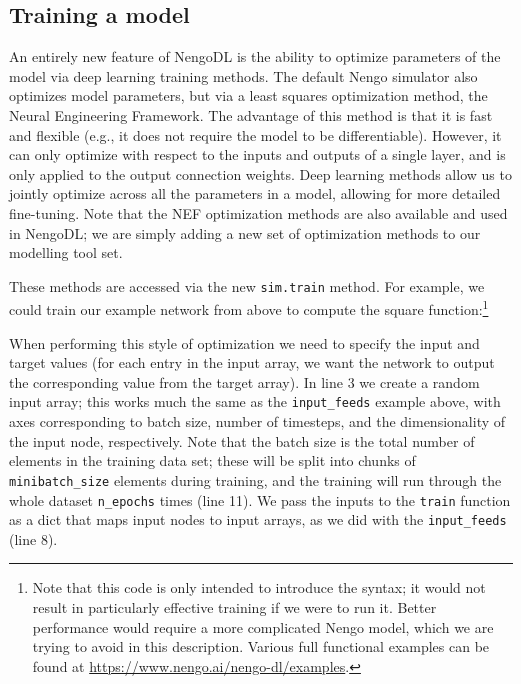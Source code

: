 \documentclass{article}
\begin{document}
\subsection{Training a model}

An entirely new feature of NengoDL is the ability to optimize parameters of the model via deep learning training methods.  The default Nengo simulator also optimizes model parameters, but via a least squares optimization method, the Neural Engineering Framework\citep[NEF;][]{Eliasmith2003}.  The advantage of this method is that it is fast and flexible (e.g., it does not require the model to be differentiable).  However, it can only optimize with respect to the inputs and outputs of a single layer, and is only applied to the output connection weights.  Deep learning methods allow us to jointly optimize across all the parameters in a model, allowing for more detailed fine-tuning.  Note that the NEF optimization methods are also available and used in NengoDL; we are simply adding a new set of optimization methods to our modelling tool set.

These methods are accessed via the new \texttt{sim.train} method.  For example, we could train our example network from above to compute the square function:\footnote{Note that this code is only intended to introduce the syntax; it would not result in particularly effective training if we were to run it.  Better performance would require a more complicated Nengo model, which we are trying to avoid in this description.  Various full functional examples can be found at \url{https://www.nengo.ai/nengo-dl/examples}.}

\lstset{numbers=left}


When performing this style of optimization we need to specify the input and target values (for each entry in the input array, we want the network to output the corresponding value from the target array).  In line 3 we create a random input array; this works much the same as the \texttt{input\_feeds} example above, with axes corresponding to batch size, number of timesteps, and the dimensionality of the input node, respectively.  Note that the batch size is the total number of elements in the training data set; these will be split into chunks of \texttt{minibatch\_size} elements during training, and the training will run through the whole dataset \texttt{n\_epochs} times (line 11).  We pass the inputs to the \texttt{train} function as a dict that maps input nodes to input arrays, as we did with the \texttt{input\_feeds} (line 8).
\end{document}
